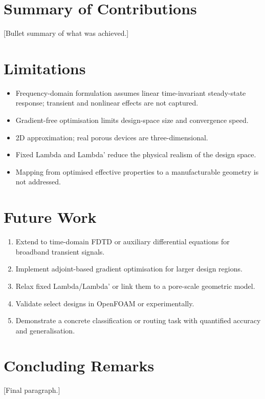 
\section{Summary of Contributions}
\label{sec:contributions}


[Bullet summary of what was achieved.]

\section{Limitations}
\label{sec:limitations}


\begin{itemize}
    \item Frequency-domain formulation assumes linear time-invariant steady-state response; transient and nonlinear effects are not captured.
    \item Gradient-free optimisation limits design-space size and convergence speed.
    \item 2D approximation; real porous devices are three-dimensional.
    \item Fixed Lambda and Lambda' reduce the physical realism of the design space.
    \item Mapping from optimised effective properties to a manufacturable geometry is not addressed.
\end{itemize}

\section{Future Work}
\label{sec:future}


\begin{enumerate}
    \item Extend to time-domain FDTD or auxiliary differential equations for broadband transient signals.
    \item Implement adjoint-based gradient optimisation for larger design regions.
    \item Relax fixed Lambda/Lambda' or link them to a pore-scale geometric model.
    \item Validate select designs in OpenFOAM or experimentally.
    \item Demonstrate a concrete classification or routing task with quantified accuracy and generalisation.
\end{enumerate}

\section{Concluding Remarks}
\label{sec:concluding}


[Final paragraph.]
